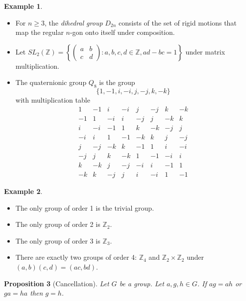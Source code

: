 \documentclass{book}
\newtheorem{prop}{Proposition}[chapter]
\theoremstyle{definition}
\newtheorem{ex}[prop]{Example}
\begin{document}
\begin{ex}
\begin{itemize}
        \item For $n \geq 3$, the \emph{dihedral group} $D_{2n}$ consists of the set of rigid
              motions that map the regular $n$-gon onto itself under composition.
              \item Let $SL_2(\mathbb{Z}) = \left\{ \left( \begin{array}{cc}
              a & b \\
              c & d \end{array} \right)
              : a,b,c,d \in \mathbb{Z}, ad - bc = 1 \right\}$ under matrix multiplication.
\item The quaternionic group $Q_8$ is the group
\[ \{ 1, -1, i, -i, j, -j, k, -k \} \]
with multiplication table
\[ \begin{array}{cccccccc}
1 & -1 & i & -i & j & -j & k & -k \\
-1 & 1 & -i & i & -j & j & -k & k \\
i & -i & -1 & 1 & k & -k & -j & j \\
-i & i & 1 & -1 & -k & k & j & -j \\
j & -j & -k & k & -1 & 1 & i & -i \\
-j & j & k & -k & 1 & -1 & -i & i \\
k & -k & j & -j & -i & i & -1 & 1 \\
-k & k & -j & j & i & -i & 1 & -1
\end{array} \]
    \end{itemize}
\end{ex}

\begin{ex}
    \begin{itemize}
        \item The only group of order 1 is the trivial group.
        \item The only group of order 2 is $\mathbb{Z}_2$.
        \item The only group of order 3 is $\mathbb{Z}_3$.
        \item There are exactly two groups of order 4: $\mathbb{Z}_4$ and $\mathbb{Z}_2
                  \times \mathbb{Z}_2$ under $(a,b) (c,d) = (ac,bd)$.
    \end{itemize}
\end{ex}

\begin{prop}[Cancellation]
    Let $G$ be a group. Let $a,g,h \in G$. If $ag = ah$ or $ga = ha$ then $g = h$.
\end{prop}
\end{document}
